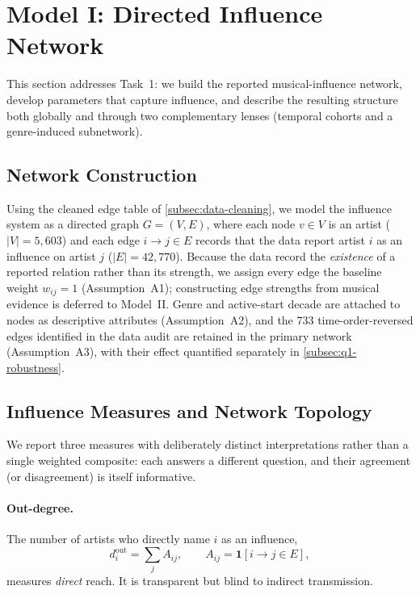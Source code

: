 \section{Model I: Directed Influence Network}\label{sec:model-influence}

This section addresses Task~1: we build the reported musical-influence network,
develop parameters that capture influence, and describe the resulting structure
both globally and through two complementary lenses (temporal cohorts and a
genre-induced subnetwork).

\subsection{Network Construction}\label{subsec:net-construction}

Using the cleaned edge table of \cref{subsec:data-cleaning}, we model the
influence system as a directed graph \(G=(V,E)\), where each node
\(v\in V\) is an artist (\(|V|=5{,}603\)) and each edge \(i\to j\in E\)
records that the data report artist \(i\) as an influence on artist \(j\)
(\(|E|=42{,}770\)). Because the data record the \emph{existence} of a
reported relation rather than its strength, we assign every edge the
baseline weight \(w_{ij}=1\) (Assumption~A1); constructing edge strengths
from musical evidence is deferred to Model~II. Genre and active-start
decade are attached to nodes as descriptive attributes (Assumption~A2),
and the 733 time-order-reversed edges identified in the data audit are
retained in the primary network (Assumption~A3), with their effect
quantified separately in \cref{subsec:q1-robustness}.

\subsection{Influence Measures and Network Topology}\label{subsec:q1-measures}

We report three measures with deliberately distinct interpretations rather
than a single weighted composite: each answers a different question, and their
agreement (or disagreement) is itself informative.

\paragraph{Out-degree.}
The number of artists who directly name \(i\) as an influence,
\begin{equation}
d_i^{\text{out}}=\sum_{j} A_{ij}, \qquad A_{ij}=\mathbf{1}[i\to j\in E],
\end{equation}
measures \emph{direct} reach. It is transparent but blind to indirect
transmission.

